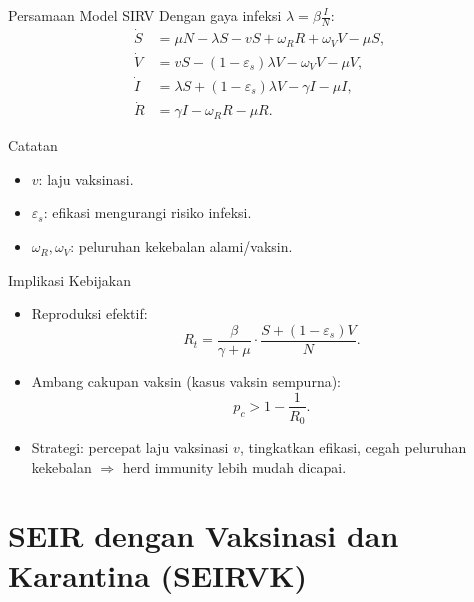 \documentclass[aspectratio=32]{beamer}
\begin{document}
\begin{frame}{Persamaan Model SIRV}
Dengan gaya infeksi $\lambda = \beta \tfrac{I}{N}$:
\[
\begin{aligned}
\dot S &= \mu N - \lambda S - vS + \omega_R R + \omega_V V - \mu S, \\
\dot V &= vS - (1-\varepsilon_s)\lambda V - \omega_V V - \mu V, \\
\dot I &= \lambda S + (1-\varepsilon_s)\lambda V - \gamma I - \mu I, \\
\dot R &= \gamma I - \omega_R R - \mu R.
\end{aligned}
\]
\begin{block}{Catatan}
\begin{itemize}
  \item $v$: laju vaksinasi. 
  \item $\varepsilon_s$: efikasi mengurangi risiko infeksi.
  \item $\omega_R, \omega_V$: peluruhan kekebalan alami/vaksin.
\end{itemize}
\end{block}
\end{frame}


\begin{frame}{Implikasi Kebijakan}
\begin{itemize}
  \item Reproduksi efektif:
  \[
    R_t = \frac{\beta}{\gamma+\mu} \cdot \frac{S + (1-\varepsilon_s)V}{N}.
  \]
  \item Ambang cakupan vaksin (kasus vaksin sempurna):
  \[
    p_c > 1 - \frac{1}{R_0}.
  \]
  \item Strategi: percepat laju vaksinasi $v$, tingkatkan efikasi, cegah peluruhan kekebalan $\Rightarrow$ herd immunity lebih mudah dicapai.
\end{itemize}
\end{frame}

\section{SEIR dengan Vaksinasi dan Karantina (SEIRVK)}
\end{document}
